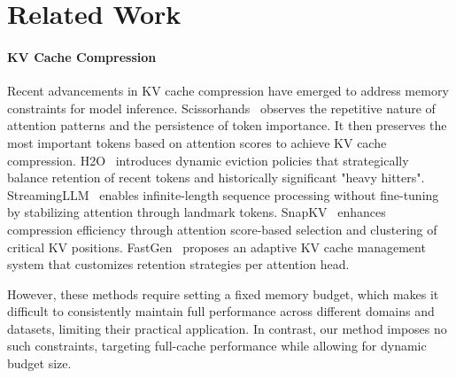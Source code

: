 \section{Related Work}
\paragraph{KV Cache Compression} Recent advancements in KV cache compression have emerged to address memory constraints for model inference. Scissorhands~\cite{DBLP:conf/nips/LiuDLWXXKS23} observes the repetitive nature of attention patterns and the persistence of token importance. It then preserves the most important tokens based on attention scores to achieve KV cache compression. H2O~\cite{DBLP:conf/nips/Zhang00CZC0TRBW23} introduces dynamic eviction policies that strategically balance retention of recent tokens and historically significant "heavy hitters".  StreamingLLM~\cite{DBLP:conf/iclr/XiaoTCHL24} enables infinite-length sequence processing without fine-tuning by stabilizing attention through landmark tokens.  SnapKV~\cite{DBLP:conf/nips/LiHYVLYCLC24} enhances compression efficiency through attention score-based selection and clustering of critical KV positions. FastGen~\cite{DBLP:conf/iclr/Ge0LZ0024} proposes an adaptive KV cache management system that customizes retention strategies per attention head.

However, these methods require setting a fixed memory budget, which makes it difficult to consistently maintain full performance across different domains and datasets, limiting their practical application. In contrast, our method imposes no such constraints, targeting full-cache performance while allowing for dynamic budget size.
